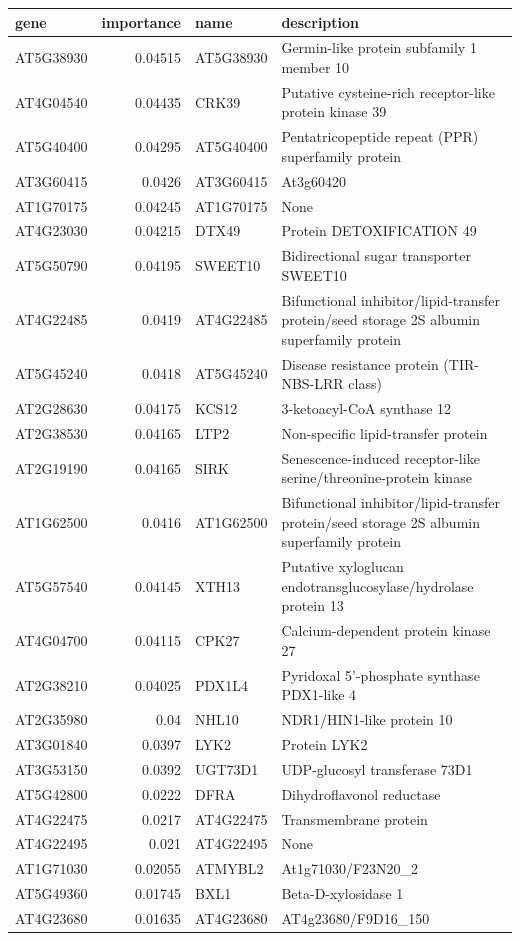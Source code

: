\documentclass[11pt]{article}
\begin{document}
\begin{center}
\begin{tabular}{lrll}
gene & importance & name & description\\
\hline
AT5G38930 & 0.04515 & AT5G38930 & Germin-like protein subfamily 1 member 10\\
AT4G04540 & 0.04435 & CRK39 & Putative cysteine-rich receptor-like protein kinase 39\\
AT5G40400 & 0.04295 & AT5G40400 & Pentatricopeptide repeat (PPR) superfamily protein\\
AT3G60415 & 0.0426 & AT3G60415 & At3g60420\\
AT1G70175 & 0.04245 & AT1G70175 & None\\
AT4G23030 & 0.04215 & DTX49 & Protein DETOXIFICATION 49\\
AT5G50790 & 0.04195 & SWEET10 & Bidirectional sugar transporter SWEET10\\
AT4G22485 & 0.0419 & AT4G22485 & Bifunctional inhibitor/lipid-transfer protein/seed storage 2S albumin superfamily protein\\
AT5G45240 & 0.0418 & AT5G45240 & Disease resistance protein (TIR-NBS-LRR class)\\
AT2G28630 & 0.04175 & KCS12 & 3-ketoacyl-CoA synthase 12\\
AT2G38530 & 0.04165 & LTP2 & Non-specific lipid-transfer protein\\
AT2G19190 & 0.04165 & SIRK & Senescence-induced receptor-like serine/threonine-protein kinase\\
AT1G62500 & 0.0416 & AT1G62500 & Bifunctional inhibitor/lipid-transfer protein/seed storage 2S albumin superfamily protein\\
AT5G57540 & 0.04145 & XTH13 & Putative xyloglucan endotransglucosylase/hydrolase protein 13\\
AT4G04700 & 0.04115 & CPK27 & Calcium-dependent protein kinase 27\\
AT2G38210 & 0.04025 & PDX1L4 & Pyridoxal 5'-phosphate synthase PDX1-like 4\\
AT2G35980 & 0.04 & NHL10 & NDR1/HIN1-like protein 10\\
AT3G01840 & 0.0397 & LYK2 & Protein LYK2\\
AT3G53150 & 0.0392 & UGT73D1 & UDP-glucosyl transferase 73D1\\
AT5G42800 & 0.0222 & DFRA & Dihydroflavonol reductase\\
AT4G22475 & 0.0217 & AT4G22475 & Transmembrane protein\\
AT4G22495 & 0.021 & AT4G22495 & None\\
AT1G71030 & 0.02055 & ATMYBL2 & At1g71030/F23N20\_2\\
AT5G49360 & 0.01745 & BXL1 & Beta-D-xylosidase 1\\
AT4G23680 & 0.01635 & AT4G23680 & AT4g23680/F9D16\_150\\
\end{tabular}
\end{center}
\end{document}
